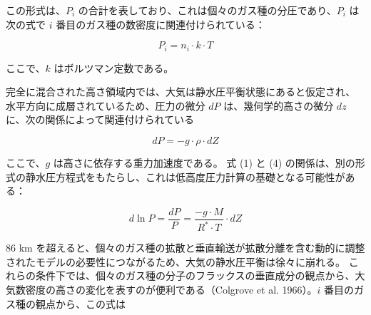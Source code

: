 \documentclass{article}
\begin{document}
この形式は、$P_i$ の合計を表しており、これは個々のガス種の分圧であり、$P_i$ は次の式で $i$ 番目のガス種の数密度に関連付けられている：

\begin{equation}
    P_i = n_i \cdot k \cdot T \tag{3}
\end{equation}

ここで、$k$ はボルツマン定数である。

完全に混合された高さ領域内では、大気は静水圧平衡状態にあると仮定され、水平方向に成層されているため、圧力の微分 $dP$ は、幾何学的高さの微分 $dz$ に、次の関係によって関連付けられている

\begin{equation}
    dP = -g \cdot \rho \cdot dZ \tag{4}
\end{equation}

ここで、$g$ は高さに依存する重力加速度である。
式 (1) と (4) の関係は、別の形式の静水圧方程式をもたらし、これは低高度圧力計算の基礎となる可能性がある：

\begin{equation}
d \ln P = \frac{dP}{P} = \frac{-g \cdot M}{R^* \cdot T} \cdot dZ \tag{5}
\end{equation}

86 km を超えると、個々のガス種の拡散と垂直輸送が拡散分離を含む動的に調整されたモデルの必要性につながるため、大気の静水圧平衡は徐々に崩れる。
これらの条件下では、個々のガス種の分子のフラックスの垂直成分の観点から、大気数密度の高さの変化を表すのが便利である（Colgrove et al. 1966）。$i$ 番目のガス種の観点から、この式は
\end{document}
